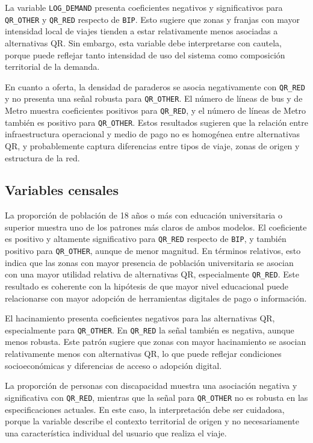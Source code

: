 La variable \texttt{LOG\_DEMAND} presenta coeficientes negativos y significativos para
\texttt{QR\_OTHER} y \texttt{QR\_RED} respecto de \texttt{BIP}. Esto sugiere que zonas y franjas con
mayor intensidad local de viajes tienden a estar relativamente menos asociadas a alternativas QR. Sin
embargo, esta variable debe interpretarse con cautela, porque puede reflejar tanto intensidad de uso
del sistema como composición territorial de la demanda.

En cuanto a oferta, la densidad de paraderos se asocia negativamente con \texttt{QR\_RED} y no
presenta una señal robusta para \texttt{QR\_OTHER}. El número de líneas de bus y de Metro muestra
coeficientes positivos para \texttt{QR\_RED}, y el número de líneas de Metro también es positivo para
\texttt{QR\_OTHER}. Estos resultados sugieren que la relación entre infraestructura operacional y
medio de pago no es homogénea entre alternativas QR, y probablemente captura diferencias entre tipos
de viaje, zonas de origen y estructura de la red.

\subsection{Variables censales}

La proporción de población de 18 años o más con educación universitaria o superior muestra uno de los
patrones más claros de ambos modelos. El coeficiente es positivo y altamente significativo para
\texttt{QR\_RED} respecto de \texttt{BIP}, y también positivo para \texttt{QR\_OTHER}, aunque de
menor magnitud. En términos relativos, esto indica que las zonas con mayor presencia de población
universitaria se asocian con una mayor utilidad relativa de alternativas QR, especialmente
\texttt{QR\_RED}. Este resultado es coherente con la hipótesis de que mayor nivel educacional puede
relacionarse con mayor adopción de herramientas digitales de pago o información.

El hacinamiento presenta coeficientes negativos para las alternativas QR, especialmente para
\texttt{QR\_OTHER}. En \texttt{QR\_RED} la señal también es negativa, aunque menos robusta. Este
patrón sugiere que zonas con mayor hacinamiento se asocian relativamente menos con alternativas QR,
lo que puede reflejar condiciones socioeconómicas y diferencias de acceso o adopción digital.

La proporción de personas con discapacidad muestra una asociación negativa y significativa con
\texttt{QR\_RED}, mientras que la señal para \texttt{QR\_OTHER} no es robusta en las especificaciones
actuales. En este caso, la interpretación debe ser cuidadosa, porque la variable describe el contexto
territorial de origen y no necesariamente una característica individual del usuario que realiza el
viaje.

